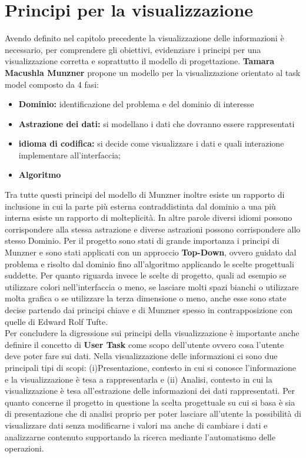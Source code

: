 {\section{Principi per la visualizzazione} 
Avendo definito nel capitolo precedente la visualizzazione delle informazioni è necessario, per comprendere gli obiettivi, evidenziare i principi per una visualizzazione corretta e soprattutto il modello di progettazione.
\textbf{Tamara Macushla Munzner} propone un modello per la visualizzazione orientato al task model composto da 4 fasi:
\begin{itemize}
	\item \textbf{Dominio:} identificazione del problema e del dominio di interesse
	\item \textbf{Astrazione dei dati:} si modellano i dati che dovranno essere rappresentati
	\item \textbf{idioma di codifica:} si decide come visualizzare i dati e quali interazione implementare all'interfaccia;
	\item \textbf{Algoritmo}
\end{itemize}

Tra tutte questi principi del modello di Munzner inoltre esiste un rapporto di inclusione in cui la parte più esterna contraddistinta dal dominio a una più interna esiste un rapporto di molteplicità.
In altre parole diversi idiomi possono corrispondere alla stessa astrazione e diverse astrazioni possono corrispondere allo stesso Dominio.
Per il progetto sono stati di grande importanza i principi di Munzner e sono stati applicati con un approccio \textbf{Top-Down}, ovvero guidato dal problema e risolto dal dominio fino all'algoritmo applicando le scelte progettuali suddette.
Per quanto riguarda invece le scelte di progetto, quali ad esempio se utilizzare colori nell'interfaccia o meno, se lasciare molti spazi bianchi o utilizzare molta grafica o se utilizzare la terza dimensione o meno, anche esse sono state decise partendo dai principi chiave e di Munzner spesso in contrapposizione con quelle di Edward Rolf Tufte.\\
Per concludere la digressione sui principi della visualizzazione è importante anche definire il concetto di \textbf{User Task} come scopo dell'utente ovvero cosa l'utente deve poter fare sui dati.
Nella visualizzazione delle informazioni ci sono due principali tipi di scopi: (i)Presentazione, contesto in cui si conosce l'informazione e la visualizzazione è tesa a rappresentarla e (ii) Analisi, contesto in cui la visualizzazione è tesa all'estrazione delle informazioni dei dati rappresentati.
Per quanto concerne il progetto in questione la scelta progettuale su cui si basa è sia di presentazione che di analisi proprio per poter lasciare all'utente la possibilità di visualizzare dati senza modificarne i valori ma anche di cambiare i dati e analizzarne contenuto supportando la ricerca mediante l'automatismo delle operazioni.
}